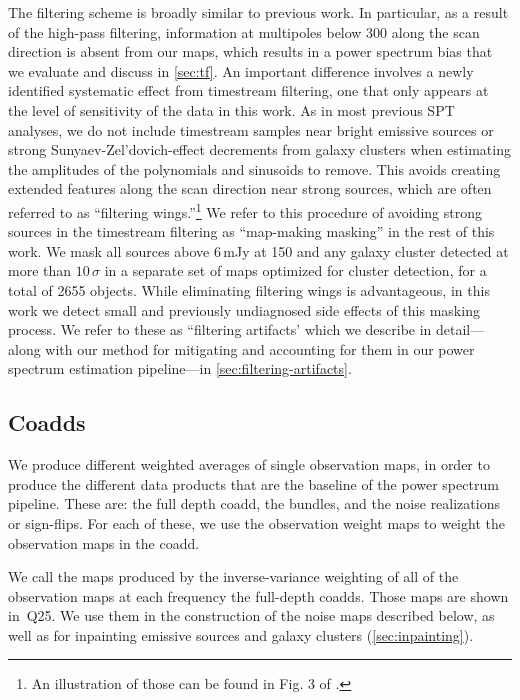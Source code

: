 The filtering scheme is broadly similar to previous work. 
In particular, as a result of the high-pass filtering, information at multipoles below 300 along the scan direction is absent from our maps, which results in a power spectrum bias that we evaluate and discuss in \cref{sec:tf}. 
An important difference involves a newly identified systematic effect from timestream filtering, one that only appears at the level of sensitivity of the data in this work.
As in most previous SPT analyses, we do not include timestream samples near bright emissive sources or strong Sunyaev-Zel'dovich-effect decrements from galaxy clusters when estimating the amplitudes of the polynomials and sinusoids to remove.
This avoids creating extended features along the scan direction near strong sources, which are often referred to as ``filtering wings.''\footnote{An illustration of those can be found in Fig. 3 of \citep{archipley_2025}. }
We refer to this procedure of avoiding strong sources in the timestream filtering as ``map-making masking'' in the rest of this work.
We mask all sources above $6\,$mJy at 150\ghz{} and any galaxy cluster detected at more than $10\,\sigma$ in a separate set of maps optimized for cluster detection, for a total of 2655 objects.
While eliminating filtering wings is advantageous, in this work we detect small and previously undiagnosed side effects of this masking process. We refer to these as ``filtering artifacts' which we describe in detail---along with our method for mitigating and accounting for them in our power spectrum estimation pipeline---in \cref{sec:filtering-artifacts}.

\subsection{Coadds}
\label{sec:coadd}
We produce different weighted averages of single observation maps, in order to produce the different data products that are the baseline of the power spectrum pipeline. 
These are: the full depth coadd, the bundles, and the noise realizations or sign-flips. For each of these, we use the {observation} weight maps to weight the observation maps in the coadd.

We call the maps produced by the inverse-variance weighting of all of the observation maps at each frequency the full-depth coadds. 
Those maps are shown in~Q25. 
We use them in the construction of the noise maps described below, as well as for inpainting emissive sources and galaxy clusters (\cref{sec:inpainting}).

